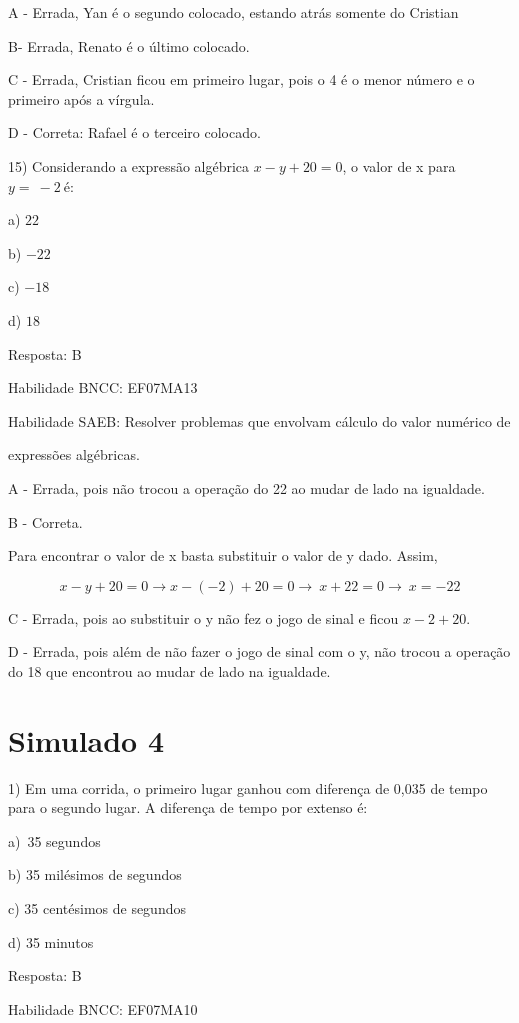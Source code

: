 A - Errada, Yan é o segundo colocado, estando atrás somente do Cristian

B- Errada, Renato é o último colocado.

C - Errada, Cristian ficou em primeiro lugar, pois o 4 é o menor número
e o primeiro após a vírgula.

D - Correta: Rafael é o terceiro colocado.

15) Considerando a expressão algébrica \(x - y + 20 = 0\), o valor de x
para \(y = \  - 2\ \)é:

a) \(22\)

b) \(- 22\)

c) \(- 18\)

d) \(18\)

Resposta: B

Habilidade BNCC: EF07MA13

Habilidade SAEB: Resolver problemas que envolvam cálculo do valor
numérico de

expressões algébricas.

A - Errada, pois não trocou a operação do 22 ao mudar de lado na
igualdade.

B - Correta.

Para encontrar o valor de x basta substituir o valor de y dado. Assim,

\[x - y + 20 = 0 \rightarrow x - ( - 2) + 20 = 0 \rightarrow \ x + 22 = 0 \rightarrow \ x = - 22\]

C - Errada, pois ao substituir o y não fez o jogo de sinal e ficou
\(x - 2 + 20\).

D - Errada, pois além de não fazer o jogo de sinal com o y, não trocou a
operação do 18 que encontrou ao mudar de lado na igualdade.

\hypertarget{simulado-4}{%
\section{Simulado 4}\label{simulado-4}}

1) Em uma corrida, o primeiro lugar ganhou com diferença de 0,035 de
tempo para o segundo lugar. A diferença de tempo por extenso é:

a)~35 segundos

b) 35 milésimos de segundos

c) 35 centésimos de segundos~

d) 35 minutos

Resposta: B~

Habilidade BNCC: EF07MA10

